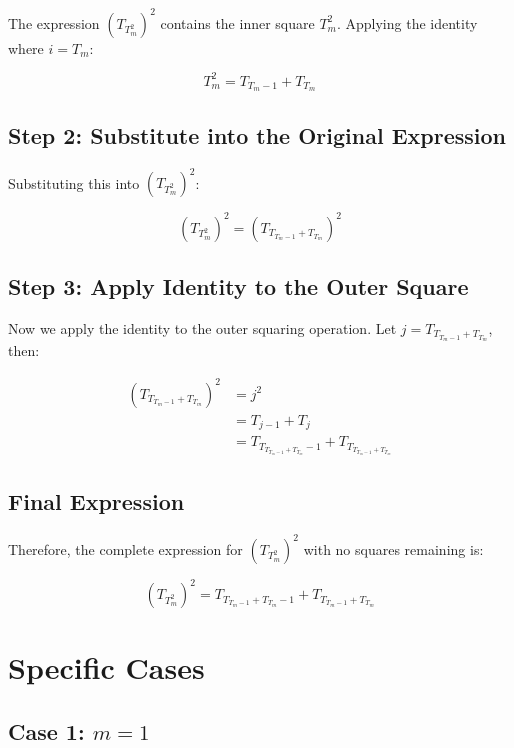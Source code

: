 \documentclass{article}
\begin{document}
The expression $(T_{T_m^2})^2$ contains the inner square $T_m^2$. Applying the identity where $i = T_m$:

\begin{equation}
T_m^2 = T_{T_m-1} + T_{T_m}
\end{equation}

\subsection{Step 2: Substitute into the Original Expression}

Substituting this into $(T_{T_m^2})^2$:

\begin{equation}
(T_{T_m^2})^2 = \left(T_{T_{T_m-1} + T_{T_m}}\right)^2
\end{equation}

\subsection{Step 3: Apply Identity to the Outer Square}

Now we apply the identity to the outer squaring operation. Let $j = T_{T_{T_m-1} + T_{T_m}}$, then:

\begin{align}
\left(T_{T_{T_m-1} + T_{T_m}}\right)^2 &= j^2 \\
&= T_{j-1} + T_j \\
&= T_{T_{T_{T_m-1} + T_{T_m}}-1} + T_{T_{T_{T_m-1} + T_{T_m}}}
\end{align}

\subsection{Final Expression}

Therefore, the complete expression for $(T_{T_m^2})^2$ with no squares remaining is:

\begin{equation}
\boxed{(T_{T_m^2})^2 = T_{T_{T_m-1} + T_{T_m}-1} + T_{T_{T_m-1} + T_{T_m}}}
\end{equation}

\section{Specific Cases}

\subsection{Case 1: $m = 1$}
\end{document}
